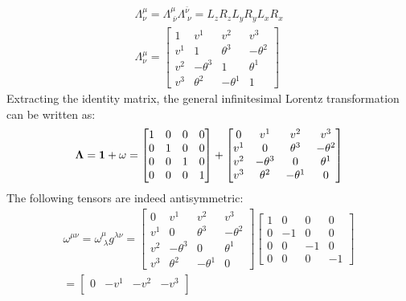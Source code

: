 \documentclass{report}
\theoremstyle{definition}
\begin{document}
\begin{chapter9}
	\begin{gather*}
		\Lambda^{\mu}_{\nu} = \Lambda^{\mu}_{\;\bar{\nu}}\Lambda^{\bar{\nu}}_{\;\nu} = 
		L_z R_z L_y R_y L_x R_x \\
		\Lambda^{\mu}_{\nu} = 
		\begin{bmatrix}
			1 & v^1 & v^2 & v^3 \\
			v^1 & 1 & \theta^3 & -\theta^2 \\
			v^2 & -\theta^3 & 1 & \theta^1 \\
			v^3 & \theta^2 & -\theta^1 & 1
		\end{bmatrix}
	\end{gather*}
	Extracting the identity matrix, the general infinitesimal Lorentz transformation can be written as:
	\begin{gather*}
		{\bf \Lambda = 1 + \omega} = \begin{bmatrix}
			1 & 0 & 0 & 0 \\
			0 & 1 & 0 & 0 \\
			0 & 0 & 1 & 0 \\
			0 & 0 & 0 & 1
		\end{bmatrix} +
		\begin{bmatrix}
			0 & v^1 & v^2 & v^3 \\
			v^1 & 0 & \theta^3 & -\theta^2 \\
			v^2 & -\theta^3 & 0 & \theta^1 \\
			v^3 & \theta^2 & -\theta^1 & 0
		\end{bmatrix} \\
	\end{gather*}
	The following tensors are indeed antisymmetric:
	\begin{gather*}
		\omega^{\mu\nu} = \omega^{\mu}_{\;\lambda}g^{\lambda\nu} =
		\begin{bmatrix}
			0 & v^1 & v^2 & v^3 \\
			v^1 & 0 & \theta^3 & -\theta^2 \\
			v^2 & -\theta^3 & 0 & \theta^1 \\
			v^3 & \theta^2 & -\theta^1 & 0
		\end{bmatrix}
		\begin{bmatrix}
			1 & 0 & 0 & 0 \\
			0 & -1 & 0 & 0 \\
			0 & 0 & -1 & 0 \\
			0 & 0 & 0 & -1 
		\end{bmatrix} \\
		=
		\begin{bmatrix}
			0 & -v^1 & -v^2 & -v^3 \\

\end{bmatrix}
\end{gather*}
\end{chapter9}
\end{document}
